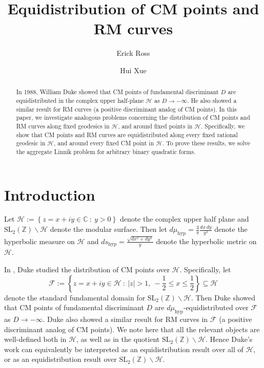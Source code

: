 \documentclass[11pt,letterpaper,reqno]{amsart}
\author[E. Ross]{Erick Ross}
\author[H. Xue]{Hui Xue}
\title{Equidistribution of CM points and RM curves}
\numberwithin{equation}{section}
\numberwithin{figure}{section}
\numberwithin{table}{section}
\newcommand{\lrcb}[1]{\left\{#1\right\}}
\newcommand{\ZZ}{\mathbb{Z}}
\newcommand{\CC}{\mathbb{C}}
\newcommand{\SL}{\text{SL}}
\newcommand{\FF}{\mathcal{F}}
\newcommand{\HH}{\mathcal{H}}
\begin{document}
\begin{abstract}
In 1988, William Duke showed that CM points of fundamental discriminant $D$ are equidistributed in the complex upper half-plane $\mathcal H$ as $D \to -\infty$. He also showed a similar result for RM curves (a positive discriminant analog of CM points).
In this paper, we investigate analogous problems concerning the distribution of CM points and RM curves along fixed geodesics in $\mathcal H$, and around fixed points in $\HH$. Specifically, we show that CM points and RM curves are equidistributed along every fixed rational geodesic in $\mathcal H$, and around every fixed CM point in $\HH$. To prove these results, we solve the aggregate Linnik problem for arbitrary binary quadratic forms.
\end{abstract}

\maketitle


\section{Introduction}

Let $\HH := \lrcb{z = x+iy \in \CC ~:~ y > 0}$ denote the complex upper half plane and $\SL_2(\ZZ)\backslash\HH$ denote the modular surface.
Then let $d\mu_{\text{hyp}} = \frac{3}{\pi} \frac{dx\,dy}{y^2}$ denote the hyperbolic measure on $\HH$ and $ds_\text{hyp} = \frac{\sqrt{dx^2+dy^2}}{y}$ denote the hyperbolic metric on $\HH$.  




In \cite{duke}, Duke studied the distribution of CM points over $\HH$.
Specifically, let
$$\FF := \lrcb{z = x+iy \in \HH ~:~ |z| > 1, ~ -\frac{1}{2} \le x \le \frac 12 } \subseteq \HH$$ denote the standard fundamental domain for $\SL_2(\ZZ)\backslash\HH$. 
Then Duke showed that CM points of fundamental discriminant $D$ are $d\mu_\text{hyp}$-equidistributed over $\FF$ as $D \to -\infty$. 
Duke also showed a similar result for RM curves in $\FF$ (a positive discriminant analog of CM points). We note here that all the relevant objects are well-defined both in $\HH$, as well as in the quotient $\SL_2(\ZZ)\backslash\HH$. Hence Duke's work can equivalently be interpreted as an equidistribution result over all of $\HH$, or as an equidistribution result over $\SL_2(\ZZ)\backslash\HH$.
\end{document}
